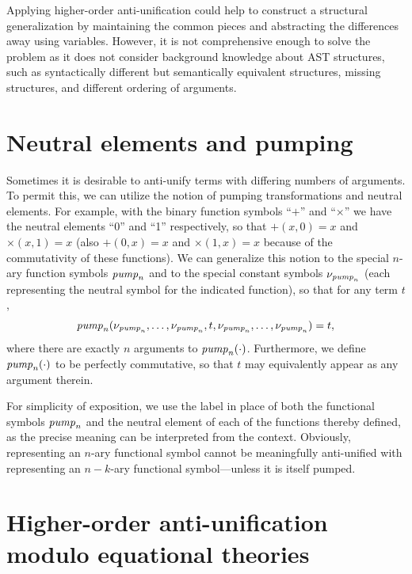 Applying higher-order anti-unification could help to construct a structural generalization by maintaining the common pieces and abstracting the differences away using variables. However, it is not comprehensive enough to solve the problem as it does not consider background knowledge about AST structures, such as syntactically different but semantically equivalent structures, missing structures, and different ordering of arguments.

\section{Neutral elements and pumping}

Sometimes it is desirable to anti-unify terms with differing numbers of arguments.  To permit this, we can utilize the notion of pumping transformations and neutral elements.  For example, with the binary function symbols ``$+$'' and ``$\times$'' we have the neutral elements ``0'' and ``1'' respectively, so that $+(x, 0)=x$ and $\times(x, 1)=x$ (also $+(0, x)=x$ and $\times(1, x)=x$ because of the commutativity of these functions).  We can generalize this notion to the special $n$-ary function symbols $\mathit{pump}_n$ and to the special constant symbols $\nu_{\mathit{pump}_n}$ (each representing the neutral symbol for the indicated function), so that for any term $t$,
\begin{equation*}
\mathit{pump}_n(\nu_{\mathit{pump}_n}, \ldots, \nu_{\mathit{pump}_n}, t, \nu_{\mathit{pump}_n}, \ldots, \nu_{\mathit{pump}_n}) = t,
\end{equation*}
where there are exactly $n$ arguments to $\mathit{pump}_n(\cdot)$.  Furthermore, we define $\mathit{pump}_n(\cdot)$ to be perfectly commutative, so that $t$ may equivalently appear as any argument therein.

For simplicity of exposition, we use the label \NIL{} in place of both the functional symbols $\mathit{pump}_n$ and the neutral element of each of the functions thereby defined, as the precise meaning can be interpreted from the context.  Obviously, \NIL{} representing an $n$-ary functional symbol cannot be meaningfully anti-unified with \NIL{} representing an $n-k$-ary functional symbol---unless it is itself pumped.

\section{Higher-order anti-unification modulo equational theories}\label{HOAUMT}

